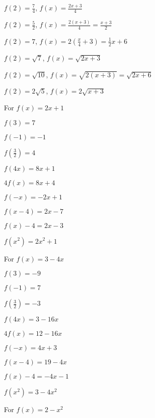 \begin{exenum}
\item $f(2) = \frac{7}{4}$, $f(x) = \frac{2x+3}{4}$

\item $f(2) = \frac{5}{2}$, $f(x) = \frac{2(x+3)}{4} = \frac{x+3}{2}$  

\item $f(2) = 7$, $f(x) = 2\left(\frac{x}{4} + 3\right) = \frac{1}{2} x + 6$   

\item $f(2) = \sqrt{7}$, $f(x) = \sqrt{2x+3}$ 

\item $f(2) = \sqrt{10}$, $f(x) = \sqrt{2(x+3)} = \sqrt{2x+6}$

\item $f(2) = 2 \sqrt{5}$, $f(x) = 2\sqrt{x+3}$ 

\item For $f(x) = 2x+1$ 

\begin{shortitemize}[$f(x-4) = 2x-7$]
\item $f(3) = 7$
\item $f(-1) = -1$
\item $f\left(\frac{3}{2} \right) = 4$
\item  $f(4x) = 8x+1$
\item $4f(x) = 8x+4$
\item $f(-x) = -2x+1$
\item $f(x-4) = 2x-7$
\item $f(x) - 4 = 2x-3$
\item  $f\left(x^2\right) = 2x^2+1$
\end{shortitemize}

\item For $f(x) = 3-4x$ 

\begin{shortitemize}
\item $f(3) = -9$
\item $f(-1) = 7$
\item $f\left(\frac{3}{2} \right) = -3$
\item  $f(4x) = 3-16x$
\item $4f(x) = 12-16x$
\item $f(-x) = 4x+3$
\item  $f(x-4) = 19-4x$
\item $f(x) - 4 = -4x-1$
\item  $f\left(x^2\right) = 3-4x^2$
\end{shortitemize}

\item For $f(x) = 2 - x^2$ 


\end{exenum}
